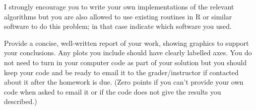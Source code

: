 \mathbf{y}\documentclass{article} %
\begin{document}
\begin{enumerate}
  I strongly encourage you to write your own implementations of the
  relevant algorithms but you are also allowed to use existing
  routines in R or similar software to do this problem; in that case
  indicate which software you used.

  Provide a concise, well-written report of your work, showing
  graphics to support your conclusions.  Any plots you include should
  have clearly labelled axes.  You do not need to turn in your
  computer code as part of your solution but you should keep your code
  and be ready to email it to the grader/instructor if contacted about
  it after the homework is due.  (Zero points if you can't provide
  your own code when asked to email it or if the code does not give
  the results you described.)

\end{enumerate}
\end{document}
